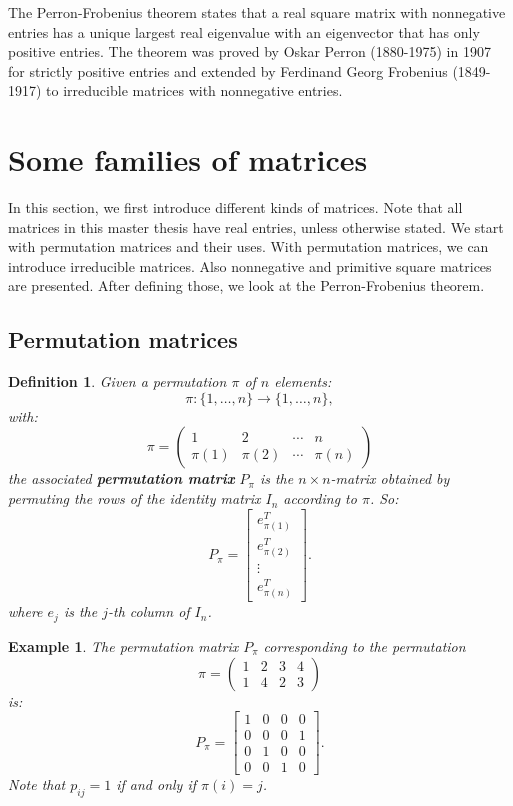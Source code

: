\documentclass[a4paper,11pt]{report}
\newtheorem{example}[theorem]{Example}
\newtheorem{definition}[theorem]{Definition}
\begin{document}
The Perron-Frobenius theorem states that a real square matrix with nonnegative entries has a unique largest real eigenvalue with an eigenvector 
that has only positive entries. The theorem was proved by Oskar 
Perron (1880-1975) in 1907 for strictly positive entries and extended by 
Ferdinand Georg Frobenius (1849-1917) to irreducible matrices with nonnegative 
entries. 

\section{Some families of matrices}
In this section, we first introduce different kinds of matrices. Note that all matrices in this master thesis have real entries,
unless otherwise stated. We start with permutation matrices and their uses. 
With permutation matrices, we can introduce irreducible matrices. Also nonnegative and primitive square matrices are presented. After defining 
those, we look at the Perron-Frobenius theorem. 
\subsection{Permutation matrices}
\begin{definition}\label{petmruation}
  Given a permutation $\pi$ of $n$ elements:
  $$\pi: \{1,\ldots,n\} \to \{1,\ldots,n\},$$
  with:
    $$\pi = \begin{pmatrix} 1 & 2 & \cdots & n \\ \pi(1) & \pi(2) & \cdots & \pi(n) \end{pmatrix} $$
  the associated \textbf{permutation matrix} $P_\pi$ is the $n\times n$-matrix 
  obtained by permuting the rows of the identity matrix $I_n$ according to $\pi$. 
  So:
 $$P_\pi = \begin{bmatrix} 
e^T_{\pi(1)}  \\
e^T_{\pi(2)}  \\
\vdots  \\
e^T_{\pi(n)}  
\end{bmatrix}.$$
 where $e_{j}$ is the $j$-th column of $I_n$.
 \end{definition}
\begin{example}
  The permutation matrix $P_\pi$ corresponding to the permutation  $$\pi = \begin{pmatrix} 1 & 2 & 3 & 4 \\ 1 & 4 & 2 & 3 \end{pmatrix} $$
  is:
  $$P_\pi = \begin{bmatrix} 
1 & 0 & 0 & 0  \\
0 & 0 & 0 & 1  \\
0 & 1 & 0 & 0  \\
0 & 0 & 1 & 0  
\end{bmatrix}.$$
Note that $p_{ij} = 1$ if and only if $\pi(i) = j$. 
\end{example}
\end{document}
